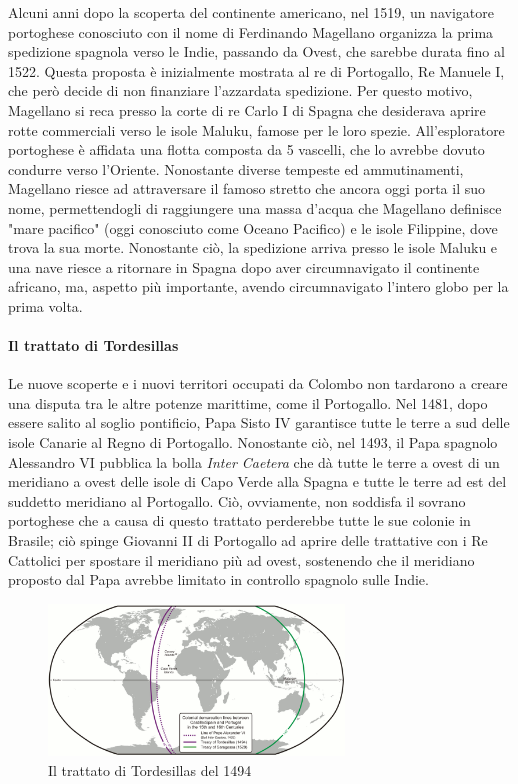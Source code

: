 \documentclass[11pt]{report}
\begin{document}
	Alcuni anni dopo la scoperta del continente americano, nel 1519, un navigatore portoghese conosciuto con il nome di Ferdinando Magellano organizza la prima spedizione spagnola verso le Indie, passando da Ovest, che sarebbe durata fino al 1522. Questa proposta è inizialmente mostrata al re di Portogallo, Re Manuele I, che però decide di non finanziare l'azzardata spedizione. Per questo motivo, Magellano si reca presso la corte di re Carlo I di Spagna che desiderava aprire rotte commerciali verso le isole Maluku, famose per le loro spezie. All'esploratore portoghese è affidata una flotta composta da 5 vascelli, che lo avrebbe dovuto condurre verso l'Oriente. Nonostante diverse tempeste ed ammutinamenti, Magellano riesce ad attraversare il famoso stretto che ancora oggi porta il suo nome, permettendogli di raggiungere una massa d'acqua che Magellano definisce "mare pacifico" (oggi conosciuto come Oceano Pacifico) e le isole Filippine, dove trova la sua morte.\cite{hartig1910magellan} Nonostante ciò, la spedizione arriva presso le isole Maluku e una nave riesce a ritornare in Spagna dopo aver circumnavigato il continente africano, ma, aspetto più importante, avendo circumnavigato l'intero globo per la prima volta.
	
	\paragraph*{Il trattato di Tordesillas}
	
	Le nuove scoperte e i nuovi territori occupati da Colombo non tardarono a creare una disputa tra le altre potenze marittime, come il Portogallo. Nel 1481, dopo essere salito al soglio pontificio, Papa Sisto IV garantisce tutte le terre a sud delle isole Canarie al Regno di Portogallo. Nonostante ciò, nel 1493, il Papa spagnolo Alessandro VI pubblica la bolla \textit{Inter Caetera} che dà tutte le terre a ovest di un meridiano a ovest delle isole di Capo Verde alla Spagna e tutte le terre ad est del suddetto meridiano al Portogallo. Ciò, ovviamente, non soddisfa il sovrano portoghese che a causa di questo trattato  perderebbe tutte le sue colonie in Brasile; ciò spinge Giovanni II di Portogallo ad aprire delle trattative con i Re Cattolici per spostare il meridiano più ad ovest, sostenendo che il meridiano proposto dal Papa avrebbe limitato in controllo spagnolo sulle Indie.\cite{parry2010age} 
	
	\begin{figure}[h]
		\centering
		\includegraphics[width=0.7\textwidth]{"tordesillas"}	
		\caption{{\small Il trattato di Tordesillas del 1494}}
	\end{figure}
	
\end{document}
